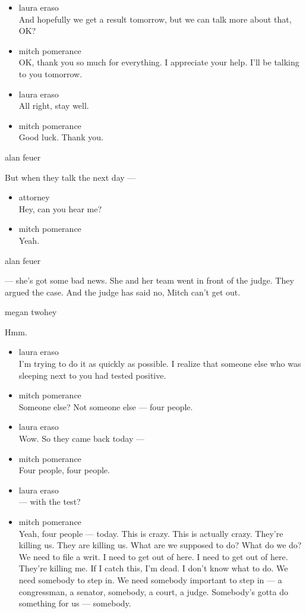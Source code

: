 \begin{itemize}
\item
  laura eraso\\
  And hopefully we get a result tomorrow, but we can talk more about
  that, OK?
\item
  mitch pomerance\\
  OK, thank you so much for everything. I appreciate your help. I'll be
  talking to you tomorrow.
\item
  laura eraso\\
  All right, stay well.
\item
  mitch pomerance\\
  Good luck. Thank you.
\end{itemize}

alan feuer

But when they talk the next day ---

\begin{itemize}
\item
  attorney\\
  Hey, can you hear me?
\item
  mitch pomerance\\
  Yeah.
\end{itemize}

alan feuer

--- she's got some bad news. She and her team went in front of the
judge. They argued the case. And the judge has said no, Mitch can't get
out.

megan twohey

Hmm.

\begin{itemize}
\item
  laura eraso\\
  I'm trying to do it as quickly as possible. I realize that someone
  else who was sleeping next to you had tested positive.
\item
  mitch pomerance\\
  Someone else? Not someone else --- four people.
\item
  laura eraso\\
  Wow. So they came back today ---
\item
  mitch pomerance\\
  Four people, four people.
\item
  laura eraso\\
  --- with the test?
\item
  mitch pomerance\\
  Yeah, four people --- today. This is crazy. This is actually crazy.
  They're killing us. They are killing us. What are we supposed to do?
  What do we do? We need to file a writ. I need to get out of here. I
  need to get out of here. They're killing me. If I catch this, I'm
  dead. I don't know what to do. We need somebody to step in. We need
  somebody important to step in --- a congressman, a senator, somebody,
  a court, a judge. Somebody's gotta do something for us --- somebody.
\end{itemize}

